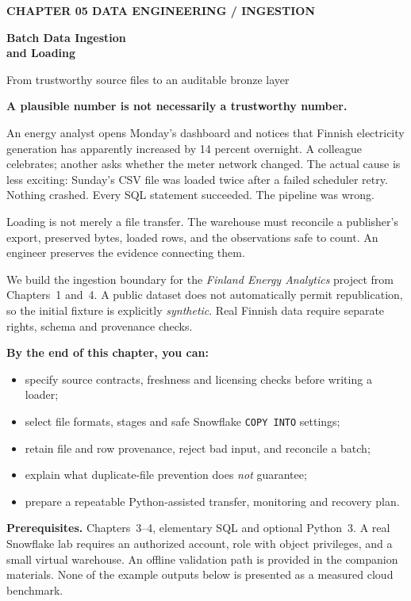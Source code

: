 \documentclass[11pt,twoside]{article}
\begin{document}
{\sffamily\bfseries\fontsize{9}{11}\selectfont\color{steelblue} CHAPTER 05 \hfill DATA ENGINEERING / INGESTION}\par\vspace{4mm}
{\sffamily\bfseries\fontsize{23}{27}\selectfont\color{navy} Batch Data Ingestion\\and Loading}\par\vspace{3mm}
{\sffamily\fontsize{11.4}{14}\selectfont\color{steelblue} From trustworthy source files to an auditable bronze layer}\par\vspace{7mm}
\begin{insight}\textbf{A plausible number is not necessarily a trustworthy number.}\par
An energy analyst opens Monday's dashboard and notices that Finnish electricity generation has apparently increased by 14 percent overnight. A colleague celebrates; another asks whether the meter network changed. The actual cause is less exciting: Sunday's CSV file was loaded twice after a failed scheduler retry. Nothing crashed. Every SQL statement succeeded. The pipeline was wrong.\end{insight}
Loading is not merely a file transfer. The warehouse must reconcile a publisher's export, preserved bytes, loaded rows, and the observations safe to count. An engineer preserves the evidence connecting them.

We build the ingestion boundary for the \emph{Finland Energy Analytics} project from Chapters~1 and~4. A public dataset does not automatically permit republication, so the initial fixture is explicitly \emph{synthetic}. Real Finnish data require separate rights, schema and provenance checks.

\begin{whitebox}\textbf{By the end of this chapter, you can:}
\begin{itemize}
\item specify source contracts, freshness and licensing checks before writing a loader;
\item select file formats, stages and safe Snowflake \texttt{COPY INTO} settings;
\item retain file and row provenance, reject bad input, and reconcile a batch;
\item explain what duplicate-file prevention does \emph{not} guarantee;
\item prepare a repeatable Python-assisted transfer, monitoring and recovery plan.
\end{itemize}\end{whitebox}
\textbf{Prerequisites.} Chapters~3--4, elementary SQL and optional Python~3. A real Snowflake lab requires an authorized account, role with object privileges, and a small virtual warehouse. An offline validation path is provided in the companion materials. None of the example outputs below is presented as a measured cloud benchmark.
\end{document}
